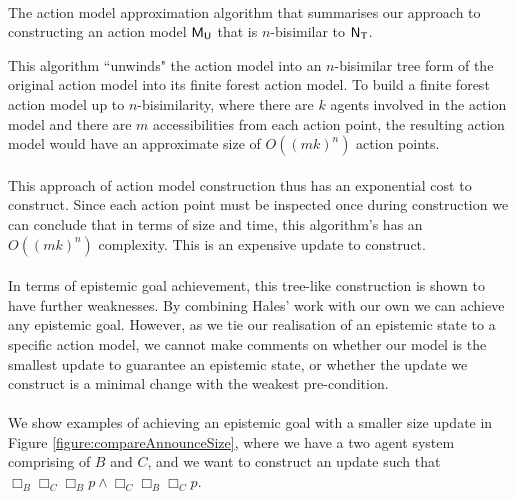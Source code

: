 \begin{algorithm}
\begin{algorithmic}
    \ForAll {$\evt \in \evT$}
    \EndFor\\
		\Return {$\evMM_\evU$}
	\EndFunction
\end{algorithmic}
\caption{The action model approximation algorithm that summarises our approach
to constructing an action model $\evMM_\evU$ that is $n$-bisimilar to
$\mathrm{\mathsf{N}}_\mathrm{\mathsf{T}}$.}
\label{algo:myAlgo}
\end{algorithm}

This algorithm ``unwinds" the action model into an $n$-bisimilar tree form of the
original action model into its finite forest action model.
To build a finite forest action model up to $n$-bisimilarity, where there are
$k$ agents involved in the action model and there are $m$ accessibilities from
each action point, the resulting action model would have an approximate size of
$O((mk)^n)$ action points.\\
\\
This approach of action model construction thus has an exponential cost to construct.
Since each action point must be inspected once during construction we can conclude that in
terms of size and time, this algorithm's has an $O((mk)^n)$ complexity.
This is an expensive update to construct.\\
\\
In terms of epistemic goal achievement, this tree-like construction is shown to
have further weaknesses.
By combining Hales' \cite{hales13synthesis} work with our own we can achieve any
epistemic goal.
However, as we tie our realisation of an epistemic state to a specific action
model, we cannot make comments on whether our model is the smallest update to
guarantee an epistemic state, or whether the update we construct is a minimal
change with the weakest pre-condition.\\
\\
We show examples of achieving an epistemic goal with a smaller size update in Figure
\ref{figure:compareAnnounceSize}, where we have a two agent system comprising of
$B$ and $C$, and we want to construct an update such that $\Box_B \Box_C \Box_B
p \land \Box_C \Box_B \Box_C p$.

